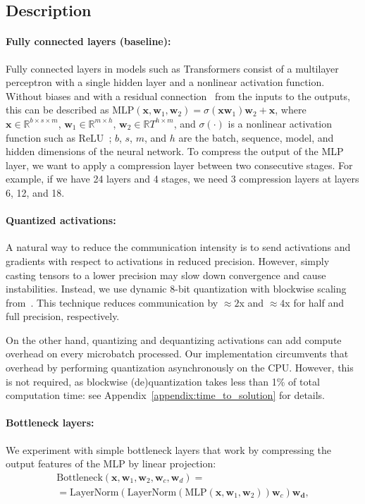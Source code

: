 \subsection{Description}\label{appendix:compression_detailed}

\paragraph{Fully connected layers (baseline):} Fully connected layers in models such as Transformers consist of a multilayer perceptron with a single hidden layer and a nonlinear activation function. Without biases and with a residual connection~\citep{resnet} from the inputs to the outputs, this can be described as $\text{MLP}(\mathbf{x}, \mathbf{w}_1, \mathbf{w}_2) = \sigma(\mathbf{x}\mathbf{w}_1)\mathbf{w}_2 + \mathbf{x}$,
where $\mathbf{x}\in\mathbb{R}^{b\times s\times m}$, $\mathbf{w}_1\in\mathbb{R}^{m\times h}$, $\mathbf{w}_2\in\mathbb{R}T^{h\times m}$, and $\sigma(\cdot)$ is a nonlinear activation function such as ReLU~\citep{alexnet}; $b$, $s$, $m$, and $h$ are the batch, sequence, model, and hidden dimensions of the neural network. To compress the output of the MLP layer, we want to apply a compression layer between two consecutive stages. For example, if we have 24 layers and 4 stages, we need 3 compression layers at layers 6, 12, and 18.%

\paragraph{Quantized activations:} A natural way to reduce the communication intensity is to send activations and gradients with respect to activations in reduced precision. However, simply casting tensors to a lower precision may slow down convergence and cause instabilities. Instead, we use dynamic 8-bit quantization with blockwise scaling from~\citep{adam8bit}. This technique reduces communication by ${\approx} 2$x and ${\approx} 4$x for half and full precision, respectively.

On the other hand, quantizing and dequantizing activations can add compute overhead on every microbatch processed. Our implementation circumvents that overhead by performing quantization asynchronously on the CPU. However, this is not required, as blockwise (de)quantization takes less than 1\% of total computation time: see Appendix~\ref{appendix:time_to_solution} for details.


\paragraph{Bottleneck layers:} We experiment with simple bottleneck layers that work by compressing the output features of the MLP by linear projection:
\begin{gather*}
    \text{Bottleneck}(\mathbf{x}, \mathbf{w}_1, \mathbf{w}_2, \mathbf{w}_c, \mathbf{w}_d) = \\ 
    = \text{LayerNorm}(\text{LayerNorm}(\text{MLP}(\mathbf{x}, \mathbf{w}_1, \mathbf{w}_2))\mathbf{w}_c)\mathbf{w_d},
\end{gather*}


